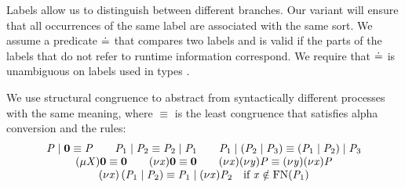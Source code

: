 Labels allow us to distinguish between different branches.
Our \MPST variant will ensure that all occurrences of the same label are associated with the same sort.
We assume a predicate $ \compL[] $ that compares two labels and is valid if the parts of the labels that do not refer to runtime information correspond.
We require that $ \compL[] $ is unambiguous on labels used in types \cite{PetersEtal21}.

We use structural congruence to abstract from syntactically different processes with the same meaning, where $ \equiv $ is the least congruence that satisfies alpha conversion and the rules:
\[ \begin{array}{c}
	\PT \mid \PEnd \equiv \PT
	\hspace{2em} \PT_1 \mid \PT_2 \equiv \PT_2 \mid \PT_1
	\hspace{2em} \PT_1 \mid \left( \PT_2 \mid \PT_3 \right) \equiv \left( \PT_1 \mid \PT_2 \right) \mid \PT_3\\
	\PRep{\ProcV}{\PEnd} \equiv \PEnd
	\hspace{2em} \PRes{\Args}{\PEnd} \equiv \PEnd
	\hspace{2em} \PRes{\Args}{\PRes{\Args[y]}{\PT}} \equiv \PRes{\Args[y]}{\PRes{\Args}{\PT}}\\
	\PRes{\Args}{\left( \PT_1 \mid \PT_2 \right)} \equiv \PT_1 \mid \PRes{\Args}{\PT_2} \quad \text{if } \Args \notin \FreeNames{\PT_1}
\end{array} \]

